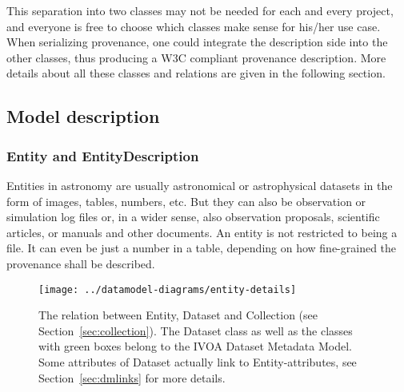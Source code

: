 
This separation into two classes may not be needed for each and every project,
and everyone is free to choose which classes make sense for his/her use case.
When serializing provenance, one could integrate the description side into the 
other classes, thus producing a W3C compliant provenance description. More details about 
all these classes and relations are given in the following section.





\subsection{Model description}
\subsubsection{Entity and EntityDescription}
Entities in astronomy are usually astronomical or astrophysical datasets in the 
form of images, tables, numbers, etc. But they can also be observation or 
simulation log files or, in a wider sense, also observation proposals, scientific 
articles, or manuals and other documents. An entity is not restricted to being
a file. 
It can even be just a number in a table, depending on how fine-grained the 
provenance shall be described.

\begin{figure}[h]
\centering
\texttt{[image: ../datamodel-diagrams/entity-details]}
\caption{The relation between Entity, Dataset and Collection (see Section~\ref{sec:collection}). 
The Dataset class as well as the classes with green boxes belong to
the IVOA Dataset Metadata Model. Some attributes of Dataset actually link to Entity-attributes, 
see Section~\ref{sec:dmlinks} for more details.}
\label{fig:entity-details}
\end{figure}

